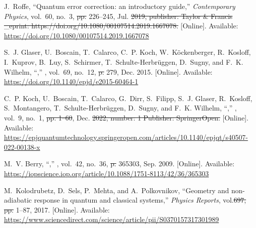 \documentclass[a4paper,oneside,11pt]{book}
\providecommand{\DIFaddtex}[1]{{\protect\color{blue}\uwave{#1}}} %
\providecommand{\DIFdeltex}[1]{{\protect\color{red}\sout{#1}}}                      %
\providecommand{\DIFaddbegin}{} %
\providecommand{\DIFaddend}{} %
\providecommand{\DIFdelbegin}{} %
\providecommand{\DIFdelend}{} %
\providecommand{\DIFadd}[1]{\texorpdfstring{\DIFaddtex{#1}}{#1}} %
\providecommand{\DIFdel}[1]{\texorpdfstring{\DIFdeltex{#1}}{}} %
\newcommand{\DIFscaledelfig}{0.5}
\newlength{\DIFdelgraphicswidth} %
\newlength{\DIFdelgraphicsheight} %
\newcommand{\DIFaddincludegraphics}[2][]{{\color{blue}\fbox{\DIFOincludegraphics[#1]{#2}}}} %
\newcommand{\DIFdelincludegraphics}[2][]{%
\sbox{\DIFdelgraphicsbox}{\DIFOincludegraphics[#1]{#2}}%
\settoboxwidth{\DIFdelgraphicswidth}{\DIFdelgraphicsbox} %
\settoboxtotalheight{\DIFdelgraphicsheight}{\DIFdelgraphicsbox} %
\scalebox{\DIFscaledelfig}{%
\parbox[b]{\DIFdelgraphicswidth}{\usebox{\DIFdelgraphicsbox}\\[-\baselineskip] \rule{\DIFdelgraphicswidth}{0em}}\llap{\resizebox{\DIFdelgraphicswidth}{\DIFdelgraphicsheight}{%
\setlength{\unitlength}{\DIFdelgraphicswidth}%
\begin{picture}(1,1)%
\thicklines\linethickness{2pt} %
{\color[rgb]{1,0,0}\put(0,0){\framebox(1,1){}}}%
{\color[rgb]{1,0,0}\put(0,0){\line( 1,1){1}}}%
{\color[rgb]{1,0,0}\put(0,1){\line(1,-1){1}}}%
\end{picture}%
}\hspace*{3pt}}} %
} %
\DeclareRobustCommand{\DIFaddbegin}{\DIFOaddbegin \let\includegraphics\DIFaddincludegraphics} %
\DeclareRobustCommand{\DIFaddend}{\DIFOaddend \let\includegraphics\DIFOincludegraphics} %
\DeclareRobustCommand{\DIFdelbegin}{\DIFOdelbegin \let\includegraphics\DIFdelincludegraphics} %
\DeclareRobustCommand{\DIFdelend}{\DIFOaddend \let\includegraphics\DIFOincludegraphics} %
\begin{document}
\begin{thebibliography}{100}
\BIBentryALTinterwordspacing
J.~Roffe, ``Quantum error correction: an introductory guide,''
  \emph{Contemporary Physics}, vol.~60, no.~3,  \DIFdelbegin \DIFdel{pp. }\DIFdelend 226--245, Jul. \DIFdelbegin \DIFdel{2019,
  publisher: Taylor \& Francis \_eprint:
  https://doi.org/10.1080/00107514.2019.1667078. }\DIFdelend \DIFaddbegin \DIFadd{2019. }\DIFaddend [Online].
  Available: \url{https://doi.org/10.1080/00107514.2019.1667078}
\BIBentrySTDinterwordspacing

\BIBentryALTinterwordspacing
S.~J. Glaser, U.~Boscain, T.~Calarco, C.~P. Koch, W.~Köckenberger, R.~Kosloff,
  I.~Kuprov, B.~Luy, S.~Schirmer, T.~Schulte-Herbrüggen, D.~Sugny, and F.~K.
  Wilhelm, ``,'' \emph{}, vol.~69, no.~12,  \DIFdelbegin \DIFdel{p. }\DIFdelend 279, Dec. 2015. [Online]. Available:
  \url{https://doi.org/10.1140/epjd/e2015-60464-1}
\BIBentrySTDinterwordspacing

\BIBentryALTinterwordspacing
C.~P. Koch, U.~Boscain, T.~Calarco, G.~Dirr, S.~Filipp, S.~J. Glaser,
  R.~Kosloff, S.~Montangero, T.~Schulte-Herbrüggen, D.~Sugny, and F.~K.
  Wilhelm, ``,'' \emph{}, vol.~9, no.~1, \DIFdelbegin \DIFdel{pp. 1--60}\DIFdelend \DIFaddbegin \DIFadd{~19}\DIFaddend , Dec. \DIFdelbegin \DIFdel{2022, number: 1 Publisher:
  SpringerOpen. }\DIFdelend \DIFaddbegin \DIFadd{2022. }\DIFaddend [Online]. Available:
  \url{https://epjquantumtechnology.springeropen.com/articles/10.1140/epjqt/s40507-022-00138-x}
\BIBentrySTDinterwordspacing

\BIBentryALTinterwordspacing
M.~V. Berry, ``,''
  \emph{}, vol.~42, no.~36,  \DIFdelbegin \DIFdel{p. }\DIFdelend 365303, Sep. 2009. [Online]. Available:
  \url{https://iopscience.iop.org/article/10.1088/1751-8113/42/36/365303}
\BIBentrySTDinterwordspacing

\BIBentryALTinterwordspacing
M.~Kolodrubetz, D.~Sels, P.~Mehta, and A.~Polkovnikov, ``Geometry and
  non-adiabatic response in quantum and classical systems,'' \emph{Physics
  Reports}, vol.\DIFdelbegin \DIFdel{697,  pp. }\DIFdelend \DIFaddbegin \DIFadd{~36,  }\DIFaddend 1--87, 2017. [Online]. Available:
  \url{https://www.sciencedirect.com/science/article/pii/S0370157317301989}
\BIBentrySTDinterwordspacing


\end{thebibliography}
\end{document}

